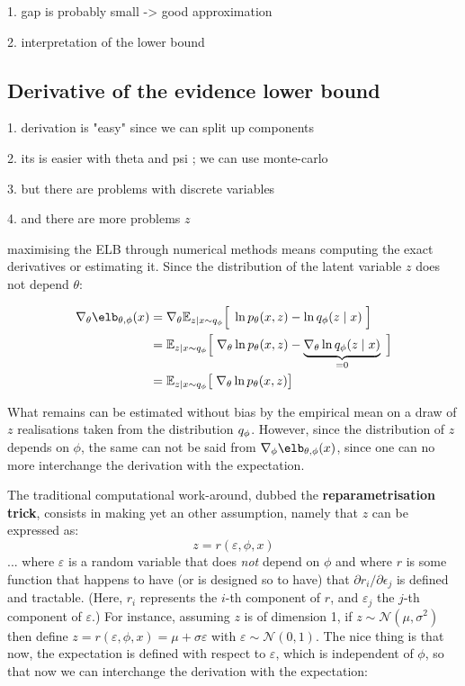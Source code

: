 \documentclass{article}
\begin{document}
\begin{appendix}
1. gap is probably small -> good approximation

2. interpretation of the lower bound

\subsection{Derivative of the evidence lower bound}

1. derivation is "easy" since we can split up components

2. its is easier with theta and psi ; we can use monte-carlo

3. but there are problems with discrete variables

4. and there are more problems $z$

maximising the ELB through numerical methods means computing the exact derivatives or estimating it. Since the distribution of the latent variable $z$ does not depend $\theta$:

\begin{align*}
\nabla_\theta\elb_{\theta,\phi}(x) & = \nabla_\theta \esp_{z|x \sim q_\phi} \Big[ \; \ln  \pt(x, z) -\ln \qp(z \mid x)  \; \Big] \\
& = \esp_{z|x \sim q_\phi} \Big[ \; \nabla_\theta \ln \pt(x, z) - \underbrace{ \nabla_\theta \ln \qp(z \mid x) }_{= 0} \; \Big] \\
& = \esp_{z|x \sim q_\phi} \big[ \; \nabla_\theta \ln \pt(x, z)\big] \\
\end{align*}

What remains can be estimated without bias by the empirical mean on a draw of $z$ realisations taken from the distribution $q_\phi$.
However, since the distribution of $z$ depends on $\phi$, the same can not be said from $\nabla_\phi\elb_{\theta,\phi}(x)$, since one can no more interchange the derivation with the expectation.

The traditional computational work-around, dubbed the \textbf{reparametrisation trick}, consists in making yet an other assumption, namely that $z$ can be expressed as:
$$z=r(\varepsilon, \phi, x)$$
... where $\varepsilon$ is a random variable that does \textit{not} depend on $\phi$ and where $r$ is some function that happens to have (or is designed so to have) that $\partial r_i / \partial \epsilon_j$ is defined and tractable. (Here, $r_i$ represents the $i$-th component of $r$, and $\varepsilon_j$ the $j$-th component of $\varepsilon$.) For instance, assuming $z$ is of dimension 1, if $z\sim \mathcal{N}(\mu,\sigma^2)$ then define $z=r(\varepsilon, \phi, x)=\mu+\sigma \varepsilon$ with $\varepsilon\sim\mathcal{N}(0,1)$. The nice thing is that now, the expectation is defined with respect to $\varepsilon$, which is independent of $\phi$, so that now we can interchange the derivation with the expectation:


\end{appendix}
\end{document}

